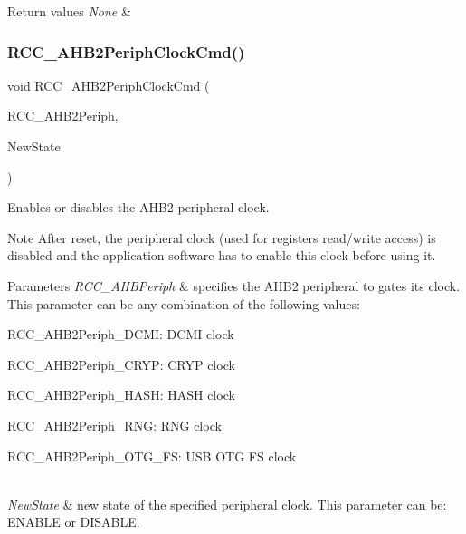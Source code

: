 \begin{DoxyRetVals}{Return values}
{\em None} & \\
\hline
\end{DoxyRetVals}
\mbox{\label{group___r_c_c_gaadffedbd87e796f01d9776b8ee01ff5e}} 
\subsubsection{\texorpdfstring{R\+C\+C\+\_\+\+A\+H\+B2\+Periph\+Clock\+Cmd()}{RCC\_AHB2PeriphClockCmd()}}
{\footnotesize\ttfamily void R\+C\+C\+\_\+\+A\+H\+B2\+Periph\+Clock\+Cmd (\begin{DoxyParamCaption}\item[{uint32\+\_\+t}]{R\+C\+C\+\_\+\+A\+H\+B2\+Periph,  }\item[{Functional\+State}]{New\+State }\end{DoxyParamCaption})}



Enables or disables the A\+H\+B2 peripheral clock. 

\begin{DoxyNote}{Note}
After reset, the peripheral clock (used for registers read/write access) is disabled and the application software has to enable this clock before using it. 
\end{DoxyNote}

\begin{DoxyParams}{Parameters}
{\em R\+C\+C\+\_\+\+A\+H\+B\+Periph} & specifies the A\+H\+B2 peripheral to gates its clock. This parameter can be any combination of the following values\+: \begin{DoxyItemize}
\item R\+C\+C\+\_\+\+A\+H\+B2\+Periph\+\_\+\+D\+C\+MI\+: D\+C\+MI clock \item R\+C\+C\+\_\+\+A\+H\+B2\+Periph\+\_\+\+C\+R\+YP\+: C\+R\+YP clock \item R\+C\+C\+\_\+\+A\+H\+B2\+Periph\+\_\+\+H\+A\+SH\+: H\+A\+SH clock \item R\+C\+C\+\_\+\+A\+H\+B2\+Periph\+\_\+\+R\+NG\+: R\+NG clock \item R\+C\+C\+\_\+\+A\+H\+B2\+Periph\+\_\+\+O\+T\+G\+\_\+\+FS\+: U\+SB O\+TG FS clock \end{DoxyItemize}
\\
\hline
{\em New\+State} & new state of the specified peripheral clock. This parameter can be\+: E\+N\+A\+B\+LE or D\+I\+S\+A\+B\+LE. \\
\hline
\end{DoxyParams}

